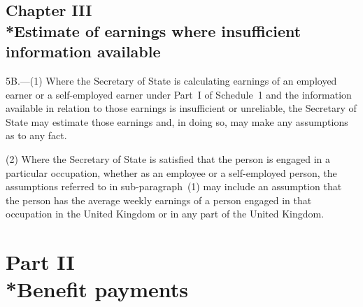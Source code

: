 \documentclass[12pt,a4paper]{article}
\begin{document}

\subsection[Chapter III --- Estimate of earnings where insufficient information available]{\sloppy Chapter III\\*Estimate of earnings where insufficient information available}

\renewcommand\parthead{--- Schedule 1 Part I Chapter III}

5B.---(1)  Where the 
Secretary of State  %
is calculating earnings of an employed earner or a self-employed earner under Part~I of Schedule~1 and the information available in relation to those earnings is insufficient or unreliable, the 
Secretary of State  %
may estimate those earnings and, in doing so, may make any assumptions as to any fact.

(2) Where the 
Secretary of State  %
is satisfied that the person is engaged in a particular occupation, whether as an employee or a self-employed person, the assumptions referred to in sub-paragraph~(1) may include an assumption that the person has the average weekly earnings of a person engaged in that occupation in the United Kingdom or in any part of the United Kingdom.


\section[Part II --- Benefit payments]{Part II\\*Benefit payments}
\end{document}
